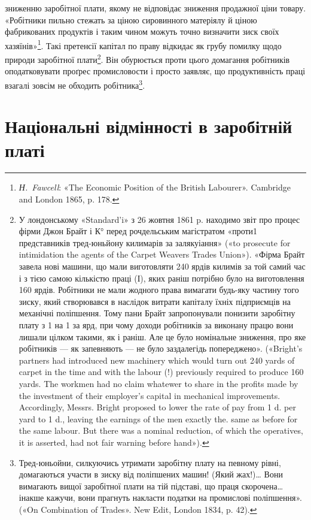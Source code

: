 зниженню заробітної плати, якому не відповідає зниження продажної
ціни товару. «Робітники пильно стежать за ціною сировинного
матеріялу й ціною фабрикованих продуктів і таким чином
можуть точно визначити зиск своїх хазяїнів»\footnote{
\emph{Н.~Fawcell}: «The Economic Position of the British Labourer».
Cambridge and London 1865, p. 178.
}. Такі претенсії
капітал по праву відкидає як грубу помилку щодо природи
заробітної плати\footnote{
У лондонському «Standard’i» з 26 жовтня 1861 p. находимо звіт
про процес фірми Джон Брайт і К° перед рочдельським магістратом
«проти1 представників тред-юньйону килимарів за залякуіання»
(«to prosecute for intimidation the agents of the Carpet Weavers Trades
Union»). «Фірма Брайт завела нові машини, що мали виготовляти 240 ярдів
килимів за той самий час і з тією самою кількістю праці (І), яких
раніш потрібно було на виготовлення 160 ярдів. Робітники не мали жодного
права вимагати будь-яку частину того зиску, який створювався в наслідок
витрати капіталу їхніх підприємців на механічні поліпшення. Тому
пани Брайт запропонували понизити заробітну плату з 1 на
1 за ярд, при чому доходи робітників за виконану працю вони лишали
цілком такими, як і раніш. Але це було номінальне зниження, про яке
робітників — як запевняють — не було заздалегідь попереджено». («Bright’s
partners had introduced new machinery which would turn out 240 yards
of carpet in the time and with the labour (!) previously required to produce
160 yards. The workmen had no claim whatewer to share in the profits
made by the investment of their employer’s capital in mechanical improvements.
Accordingly, Messrs. Bright proposed to lower the rate of pay from
1 d. per yard to 1 d., leaving the earnings of the men exactly the. same
as before for the same labour. But there was a nominal reduction, of which
the operatives, it is asserted, had not fair warning before hand»).
}. Він обурюється проти цього домагання робітників
оподатковувати проґрес промисловости і просто заявляє,
що продуктивність праці взагалі зовсім не обходить робітника\footnote{
Тред-юньойни, силкуючись утримати заробітну плату на певному
рівні, домагаються участи в зиску від поліпшених машин! (Який
жах!)\dots{} Вони вимагають вищої заробітної плати на тій підставі, що праця
скорочена\dots{} інакше кажучи, вони прагнуть накласти податки на промислові
поліпшення». («On Combination of Trades». New Edit, London
1834, p. 42).
}.

\section{Національні відмінності в заробітній платі}

